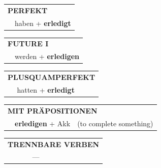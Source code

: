 \documentclass[10pt,a4paper]{revtex4-2}
\begin{document}
\begin{verbbox}
\vspace{10pt}

\begin{tabular}{rl}
\multicolumn{2}{l}{\textbf{PERFEKT}}\\
& haben + \textbf{erledigt}\\
\end{tabular}
\hfill
\begin{tabular}{rl}
\multicolumn{2}{l}{\textbf{FUTURE I}}\\
& werden + \textbf{erledigen}\\
\end{tabular}
\hfill
\begin{tabular}{rl}
\multicolumn{2}{l}{\textbf{PLUSQUAMPERFEKT}}\\
& hatten + \textbf{erledigt}\\
\end{tabular}

\vspace{10pt}

\begin{tabular}{lll}
\multicolumn{3}{l}{\textbf{MIT PRÄPOSITIONEN}}\\
& \textbf{erledigen} + Akk & (to complete something)\\
\end{tabular}
\hfill
\begin{tabular}{lll}
\multicolumn{3}{l}{\textbf{TRENNBARE VERBEN}}\\
& ---\\
\end{tabular}

\vspace{-5pt}
\end{verbbox}
\end{document}
